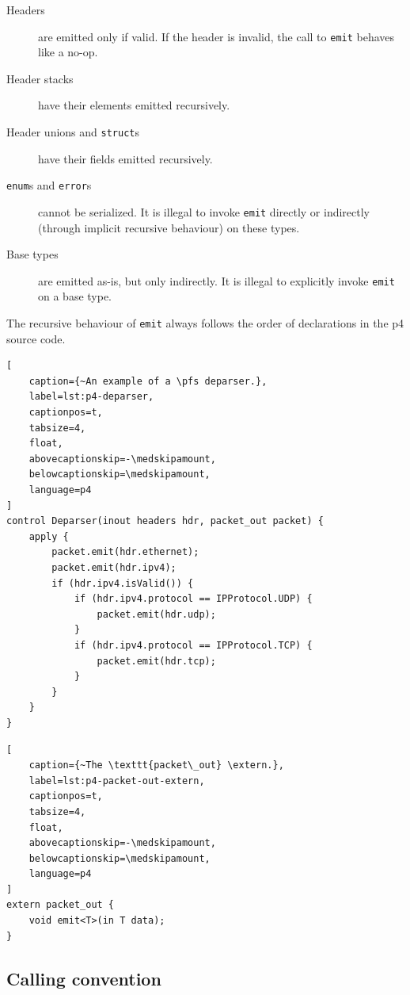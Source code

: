 \begin{description}
	\item[Headers] are emitted only if valid. If the header is invalid, the call to
	\texttt{emit} behaves like a no-op.

	\item[Header stacks] have their elements emitted recursively.

	\item[Header unions and \texttt{struct}s] have their fields emitted
	recursively.

	\item[\texttt{enum}s and \texttt{error}s] cannot be serialized. It is
	illegal to invoke \texttt{emit} directly or indirectly (through implicit
	recursive behaviour) on these types.

	\item[Base types] are emitted as-is, but only indirectly. It is illegal to
	explicitly invoke \texttt{emit} on a base type.
\end{description}

The recursive behaviour of \texttt{emit} always follows the order of
declarations in the \acrshort{p4} source code.

\begin{lstlisting}[
	caption={~An example of a \pfs deparser.},
	label=lst:p4-deparser,
	captionpos=t,
	tabsize=4,
	float,
	abovecaptionskip=-\medskipamount,
	belowcaptionskip=\medskipamount,
	language=p4
]
control Deparser(inout headers hdr, packet_out packet) {
	apply {
		packet.emit(hdr.ethernet);
		packet.emit(hdr.ipv4);
		if (hdr.ipv4.isValid()) {
			if (hdr.ipv4.protocol == IPProtocol.UDP) {
				packet.emit(hdr.udp);
			}
			if (hdr.ipv4.protocol == IPProtocol.TCP) {
				packet.emit(hdr.tcp);
			}
		}
	}
}
\end{lstlisting}

\begin{lstlisting}[
	caption={~The \texttt{packet\_out} \extern.},
	label=lst:p4-packet-out-extern,
	captionpos=t,
	tabsize=4,
	float,
	abovecaptionskip=-\medskipamount,
	belowcaptionskip=\medskipamount,
	language=p4
]
extern packet_out {
	void emit<T>(in T data);
}
\end{lstlisting}

\subsection*{Calling convention} \label{sec:p4-calling-convention}

